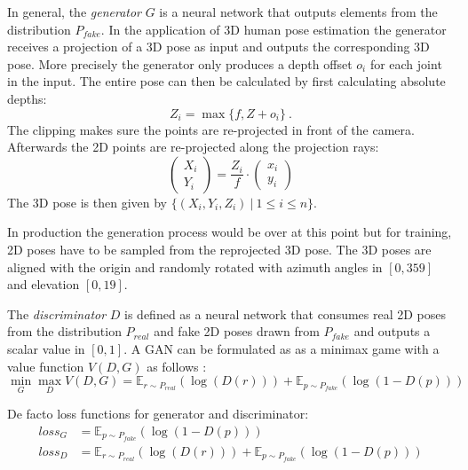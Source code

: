 In general, the \textit{generator} $G$ is a neural network that outputs  elements from the distribution $P_{fake}$.
In the application of 3D human pose estimation the generator receives a projection of a 3D pose as input and outputs the corresponding 3D pose.
More precisely the generator only produces a depth offset $o_i$ for each joint in the input.
The entire pose can then be calculated by first calculating absolute depths:
\begin{equation}
	Z_i = \max \{f, Z + o_i\} \ .
\end{equation}
The clipping makes sure the points are re-projected in front of the camera.
Afterwards the 2D points are re-projected along the projection rays:
\begin{equation}
	\begin{pmatrix}
	X_i\\
	Y_i
	\end{pmatrix} = \frac{Z_i}{f} \cdot
	\begin{pmatrix}
	x_i\\
	y_i
	\end{pmatrix}
\end{equation}
The 3D pose is then given by $\{(X_i, Y_i, Z_i)~|~ 1 \leq i \leq n\}$.

In production the generation process would be over at this point but for training, 2D poses have to be sampled from the reprojected 3D pose.
The 3D poses are aligned with the origin and randomly rotated with azimuth angles in $[0, 359]$ and elevation $[0, 19]$.

The \textit{discriminator} $D$ is defined as a neural network that consumes real 2D poses from the distribution $P_{real}$ and fake 2D poses drawn from $P_{fake}$ and outputs a scalar value in $[0, 1]$.
A GAN can be formulated as as a minimax game with a value function $V(D, G)$ as follows \cite{goodfellow14}: 
\begin{equation}
	\min_G \max_D V(D, G) = \mathbb{E}_{r\sim P_{real}}(\log(D(r))) + \mathbb{E}_{p\sim P_{fake}}(\log(1 - D(p)))
\end{equation}

De facto loss functions for generator and discriminator:
\begin{align}
	loss_G &= \mathbb{E}_{p\sim P_{fake}}(\log(1 - D(p))) \\
	loss_D &= \mathbb{E}_{r\sim P_{real}}(\log(D(r))) + \mathbb{E}_{p\sim P_{fake}}(\log(1 - D(p)))
\end{align} 